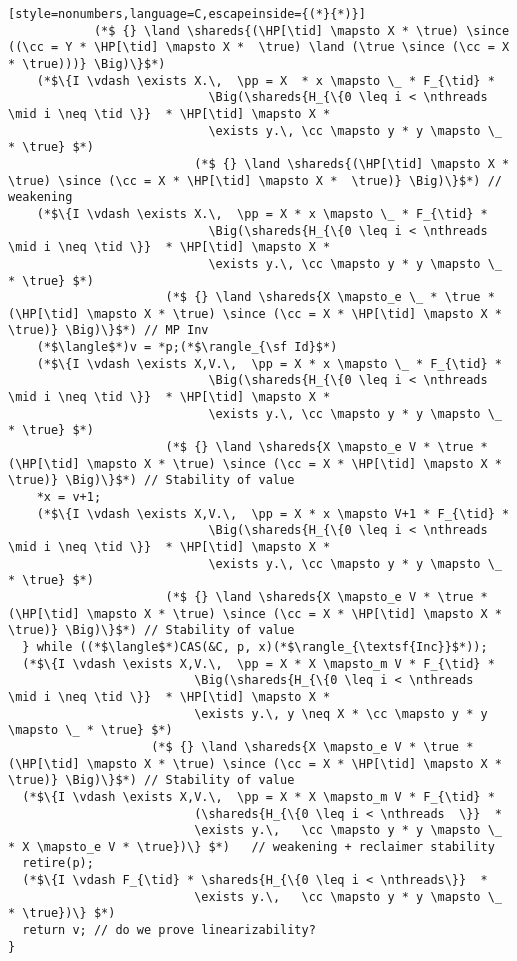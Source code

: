 \begin{figure*}
{\begin{lstlisting}[style=nonumbers,language=C,escapeinside={(*}{*)}]
            (*$ {} \land \shareds{(\HP[\tid] \mapsto X * \true) \since ((\cc = Y * \HP[\tid] \mapsto X *  \true) \land (\true \since (\cc = X * \true)))} \Big)\}$*)
    (*$\{I \vdash \exists X.\,  \pp = X  * x \mapsto \_ * F_{\tid} * 
                            \Big(\shareds{H_{\{0 \leq i < \nthreads  \mid i \neq \tid \}}  * \HP[\tid] \mapsto X *
                            \exists y.\, \cc \mapsto y * y \mapsto \_ * \true} $*)    
                          (*$ {} \land \shareds{(\HP[\tid] \mapsto X * \true) \since (\cc = X * \HP[\tid] \mapsto X *  \true)} \Big)\}$*) // weakening
    (*$\{I \vdash \exists X.\,  \pp = X * x \mapsto \_ * F_{\tid} * 
                            \Big(\shareds{H_{\{0 \leq i < \nthreads  \mid i \neq \tid \}}  * \HP[\tid] \mapsto X *
                            \exists y.\, \cc \mapsto y * y \mapsto \_ * \true} $*)    
                      (*$ {} \land \shareds{X \mapsto_e \_ * \true * (\HP[\tid] \mapsto X * \true) \since (\cc = X * \HP[\tid] \mapsto X *  \true)} \Big)\}$*) // MP Inv
    (*$\langle$*)v = *p;(*$\rangle_{\sf Id}$*)
    (*$\{I \vdash \exists X,V.\,  \pp = X * x \mapsto \_ * F_{\tid} * 
                            \Big(\shareds{H_{\{0 \leq i < \nthreads  \mid i \neq \tid \}}  * \HP[\tid] \mapsto X *
                            \exists y.\, \cc \mapsto y * y \mapsto \_ * \true} $*)    
                      (*$ {} \land \shareds{X \mapsto_e V * \true * (\HP[\tid] \mapsto X * \true) \since (\cc = X * \HP[\tid] \mapsto X *  \true)} \Big)\}$*) // Stability of value
    *x = v+1;
    (*$\{I \vdash \exists X,V.\,  \pp = X * x \mapsto V+1 * F_{\tid} * 
                            \Big(\shareds{H_{\{0 \leq i < \nthreads  \mid i \neq \tid \}}  * \HP[\tid] \mapsto X *
                            \exists y.\, \cc \mapsto y * y \mapsto \_ * \true} $*)    
                      (*$ {} \land \shareds{X \mapsto_e V * \true * (\HP[\tid] \mapsto X * \true) \since (\cc = X * \HP[\tid] \mapsto X *  \true)} \Big)\}$*) // Stability of value
  } while ((*$\langle$*)CAS(&C, p, x)(*$\rangle_{\textsf{Inc}}$*));
  (*$\{I \vdash \exists X,V.\,  \pp = X * X \mapsto_m V * F_{\tid} * 
                          \Big(\shareds{H_{\{0 \leq i < \nthreads  \mid i \neq \tid \}}  * \HP[\tid] \mapsto X *
                          \exists y.\, y \neq X * \cc \mapsto y * y \mapsto \_ * \true} $*)    
                    (*$ {} \land \shareds{X \mapsto_e V * \true * (\HP[\tid] \mapsto X * \true) \since (\cc = X * \HP[\tid] \mapsto X *  \true)} \Big)\}$*) // Stability of value
  (*$\{I \vdash \exists X,V.\,  \pp = X * X \mapsto_m V * F_{\tid} * 
                          (\shareds{H_{\{0 \leq i < \nthreads  \}}  *  
                          \exists y.\,   \cc \mapsto y * y \mapsto \_ * X \mapsto_e V * \true})\} $*)   // weakening + reclaimer stability 
  retire(p);
  (*$\{I \vdash F_{\tid} * \shareds{H_{\{0 \leq i < \nthreads\}}  *
                          \exists y.\,   \cc \mapsto y * y \mapsto \_  * \true})\} $*)   
  return v; // do we prove linearizability?
}
\end{lstlisting}
}
\end{figure*}

